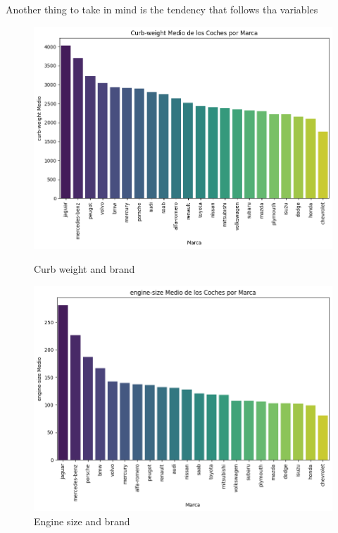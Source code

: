 \documentclass{article}
\begin{document}
Another thing to take in mind is the tendency that follows tha variables
\begin{figure}[H]
  \centering
  \begin{minipage}[b]{0.3\textwidth}
      \centering
      \includegraphics[width=\textwidth]{t1.png}
      \caption*{Curb weight and brand}
      \label{fig:t}
  \end{minipage}
  \begin{minipage}[b]{0.3\textwidth}
      \centering
      \includegraphics[width=\textwidth]{t2.png}
      \caption*{Engine size and brand}
      \label{fig:t2}
  \end{minipage}
  \begin{minipage}[b]{0.3\textwidth}

\end{minipage}
\end{figure}
\end{document}
